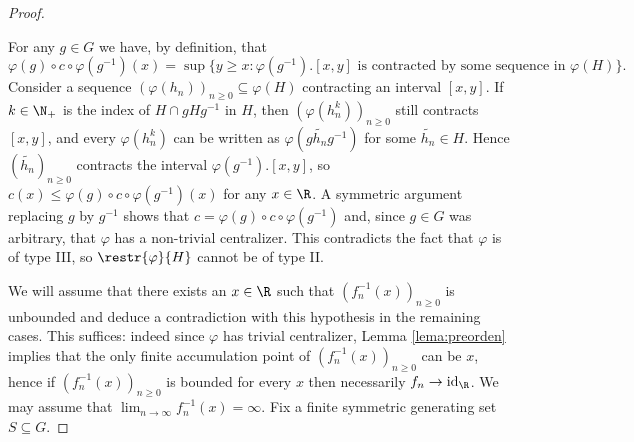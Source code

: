 \documentclass[reqno]{amsart}
\begin{document}
\begin{proof}
\begin{itemize}
For any $g \in G$ we have, by definition, that
\[
	\varphi(g) \circ c \circ \varphi(g^{-1})(x) = \sup\{y \geq x : \varphi(g^{-1}).[x,y] \text{ is contracted by some sequence in }\varphi(H)\}.
\]
Consider a sequence $(\varphi(h_n))_{n \geq 0} \subseteq \varphi(H)$ contracting an interval $[x,y]$. If $k \in \N_+$ is the index of $H \cap gHg^{-1}$ in $H$, then $(\varphi(h_n^k))_{n \geq 0}$ still contracts $[x,y]$, and every $\varphi(h_n^k)$ can be written as $\varphi(g\widetilde{h_n}g^{-1})$ for some $\widetilde{h_n} \in H$. Hence $(\widetilde{h_n})_{n \geq 0}$ contracts the interval $\varphi(g^{-1}).[x,y]$, so $ c(x) \leq \varphi(g) \circ c \circ \varphi(g^{-1})(x)$ for any $x \in \R$. A symmetric argument replacing $g$ by $g^{-1}$ shows that $c = \varphi(g) \circ c \circ \varphi(g^{-1})$ and, since $g \in G$ was arbitrary, that $\varphi$ has a non-trivial centralizer. This contradicts the fact that $\varphi$ is of type III, so $\restr{\varphi}{H}$ cannot be of type II.
\end{itemize}
We will assume that there exists an $x \in \R$ such that $(f_n^{-1}(x))_{n \geq 0}$ is unbounded and deduce a contradiction with this hypothesis in the remaining cases.  This suffices: indeed since $\varphi$ has trivial centralizer, Lemma \ref{lema:preorden} implies that the only finite accumulation point of $(f_n^{-1}(x))_{n \geq 0}$ can be $x$, hence if $(f_n^{-1}(x))_{n \geq 0}$ is bounded for every $x$ then necessarily $f_n\to \mathrm{id}_\R$. We may assume that  $\lim_{n \to \infty} f_n^{-1}(x) = \infty$. Fix a finite symmetric generating set $S \subseteq G$.


\end{proof}
\end{document}
